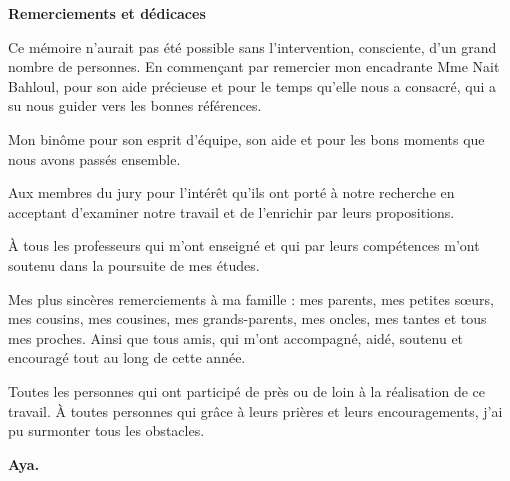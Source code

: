 \newenvironment{acknowledgement}{
  \vspace*{\fill}
  \begin{center}%
    \bfseries Remerciements et dédicaces
  \end{center}}%
  {\vfill}
  
  \thispagestyle{empty}
  
\begin{acknowledgement}

Ce mémoire n'aurait pas été possible sans l'intervention, consciente, d'un grand nombre de personnes.
En commençant par remercier mon encadrante Mme Nait Bahloul, pour son aide précieuse et pour le temps qu'elle nous a consacré, qui a su nous guider vers les bonnes références.

Mon binôme pour son esprit d'équipe, son aide et pour les bons moments que nous avons passés ensemble.

Aux membres du jury pour l'intérêt qu'ils ont porté à notre recherche en acceptant d'examiner notre travail et de l'enrichir par leurs propositions.

À tous les professeurs qui m'ont enseigné et qui par leurs compétences m'ont soutenu dans la poursuite de mes études.

Mes plus sincères remerciements à ma famille : mes parents, mes petites sœurs, mes cousins, mes cousines, mes grands-parents, mes oncles, mes tantes et tous mes proches. Ainsi que tous amis, qui m'ont accompagné, aidé, soutenu et encouragé tout au long de cette année.

Toutes les personnes qui ont participé de près ou de loin à la réalisation de ce travail. À toutes personnes qui grâce à leurs prières et leurs encouragements, j'ai pu surmonter tous les obstacles.
\begin{flushright}
\textbf{Aya.}
\end{flushright}
\end{acknowledgement}

